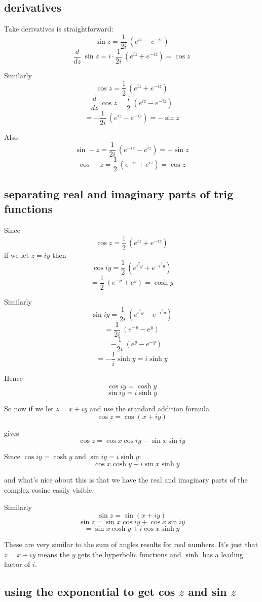 \documentclass[11pt, oneside]{article}
\begin{document}
\subsection*{derivatives}

Take derivatives is straightforward:
\[ \sin z = \frac{1}{2i} \ (e^{iz} - e^{-iz}) \]
\[ \frac{d}{dz} \ \sin z = i \cdot \frac{1}{2i} \ (e^{iz} + e^{-iz}) = \cos z \]

Similarly
\[ \cos z = \frac{1}{2} \ (e^{iz} + e^{-iz} ) \]
\[ \frac{d}{dz} \ \cos z = \frac{i}{2} \ ( e^{iz} - e^{-iz} ) \]
\[ =- \frac{1}{2i} \ ( e^{iz} - e^{-iz} ) = -\sin z \]

Also
\[ \sin -z = \frac{1}{2i} \ (e^{-iz} - e^{iz}) = - \sin z \]
\[ \cos -z = \frac{1}{2} \ (e^{-iz} + e^{iz} ) = \cos z \]

\subsection*{separating real and imaginary parts of trig functions}

Since
\[ \cos z =  \frac{1}{2} \ (e^{iz} + e^{-iz}) \]
if we let $z = iy$ then
\[ \cos iy =  \frac{1}{2} \ (e^{i^2y} + e^{-i^2y}) \]
\[ =  \frac{1}{2} \ (e^{-y} + e^{y}) = \cosh y \]

Similarly
\[ \sin iy =   \frac{1}{2i} \ (e^{i^2y} - e^{-i^2y}) \]
\[ =   \frac{1}{2i} \ (e^{-y} - e^{y}) \]
\[ = - \frac{1}{2i} \ (e^y - e^{-y}) \]
\[ = - \frac{1}{i} \sinh y  = i \sinh y \]

Hence 
\[ \cos iy = \cosh y \]
\[ \sin iy =  i \sinh y \]

So now if we let $z = x + iy$ and use the standard addition formula
\[ \cos z = \cos (x + iy) \]

gives
\[ \cos z = \cos x \cos iy - \sin x \sin iy \]

Since $\cos iy = \cosh y$ and $\sin iy = i \sinh y$:
\[ = \cos x \cosh y - i \sin x \sinh y \]

and what's nice about this is that we have the real and imaginary parts of the complex cosine easily visible.  

Similarly
\[ \sin z = \sin(x + iy) \]
\[ \sin z = \sin x \cos iy + \cos x \sin iy \]
\[ = \sin x \cosh y + i \cos x \sinh y \]

These are very similar to the sum of angles results for real numbers.  It's just that $z = x + iy$ means the $y$ gets the hyperbolic functions and $\sinh$ has a leading factor of $i$.

\subsection*{using the exponential to get cos $z$ and sin $z$}
\end{document}
